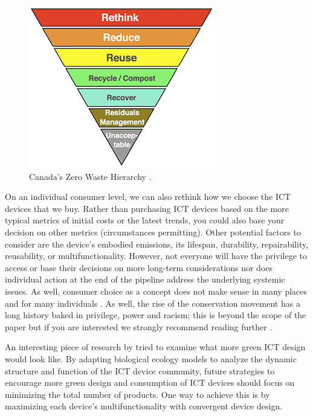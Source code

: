 \documentclass{article}
\begin{document}
\begin{figure}[h]
    \includegraphics[width=.5\textwidth]{./images/zero_waste_hierarchy_crop.png}
    \centering
    \caption{Canada's Zero Waste Hierarchy \cite{zerowastecanada2017hierarchy}.}
    \label{zero_waste_hierarchy}
\end{figure}

On an individual consumer level, we can also rethink how we choose the ICT devices that we buy. Rather than purchasing ICT devices based on the more typical metrics of initial costs or the latest trends, you could also base your decision on other metrics (circumstances permitting). Other potential factors to consider are the device's embodied emissions, its lifespan, durability, repairability, reusability, or multifunctionality. However, not everyone will have the privilege to access or base their decisions on more long-term considerations \cite{boddy2016telling} nor does individual action at the end of the pipeline address the underlying systemic issues. As well, consumer choice as a concept does not make sense in many places and for many individuals \cite{liboiron2018plastic}. As well, the rise of the conservation movement has a long history baked in privilege, power and racism; this is beyond the scope of the paper but if you are interested we strongly recommend reading further \cite{taylor2016rise, purdy2015environmentalracism}.

An interesting piece of research by \cite{ryen2014community} tried to examine what more green ICT design would look like. By adapting biological ecology models to analyze the dynamic structure and function of the ICT device community, future strategies to encourage more green design and consumption of ICT devices should focus on minimizing the total number of products. One way to achieve this is by maximizing each device's multifunctionality with convergent device design.

\end{document}
